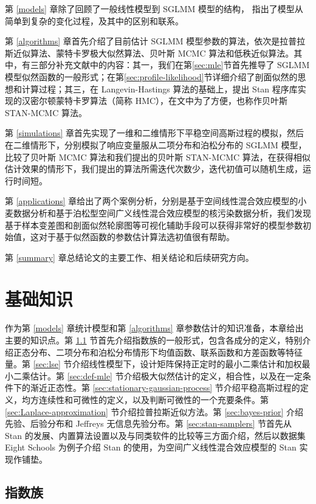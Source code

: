 \documentclass[12pt,a4paper,UTF8,twoside]{book}
\theoremstyle{definition}
\theoremstyle{definition}
\theoremstyle{definition}
\theoremstyle{remark}
\begin{document}
第 \ref{models} 章除了回顾了一般线性模型到 SGLMM 模型的结构，
指出了模型从简单到复杂的变化过程，及其中的区别和联系。

第 \ref{algorithms} 章首先介绍了目前估计 SGLMM
模型参数的算法，依次是拉普拉斯近似算法、蒙特卡罗极大似然算法、贝叶斯
MCMC
算法和低秩近似算法。其中，有三部分补充文献中的内容：其一，我们在第\ref{sec:mle}节首先推导了
SGLMM
模型似然函数的一般形式；在第\ref{sec:profile-likelihood}节详细介绍了剖面似然的思想和计算过程；其三，在
Langevin-Hastings 算法的基础上，提出 Stan
程序库实现的汉密尔顿蒙特卡罗算法（简称
HMC），在文中为了方便，也称作贝叶斯 STAN-MCMC 算法。

第 \ref{simulations}
章首先实现了一维和二维情形下平稳空间高斯过程的模拟，然后在二维情形下，分别模拟了响应变量服从二项分布和泊松分布的
SGLMM 模型，比较了贝叶斯 MCMC 算法和我们提出的贝叶斯 STAN-MCMC
算法，在获得相似估计效果的情形下，我们提出的算法所需迭代次数少，迭代初值可以随机生成，运行时间短。

第 \ref{applications}
章给出了两个案例分析，分别是基于空间线性混合效应模型的小麦数据分析和基于泊松型空间广义线性混合效应模型的核污染数据分析，我们发现基于样本变差图和剖面似然轮廓图等可视化辅助手段可以获得非常好的模型参数初始值，这对于基于似然函数的参数估计算法选初值很有帮助。

第 \ref{summary} 章总结论文的主要工作、相关结论和后续研究方向。

\hypertarget{prepare}{%
\chapter{基础知识}\label{prepare}}

作为第 \ref{models} 章统计模型和第 \ref{algorithms}
章参数估计的知识准备，本章给出主要的知识点。第 \ref{sec:exp}
节首先介绍指数族的一般形式，包含各成分的定义，特别介绍正态分布、二项分布和泊松分布情形下均值函数、联系函数和方差函数等特征量。第
\ref{sec:lse}
节介绍线性模型下，设计矩阵保持正定时的最小二乘估计和加权最小二乘估计。第
\ref{sec:def-mle}
节介绍极大似然估计的定义，相合性，以及在一定条件下的渐近正态性。第
\ref{sec:stationary-gaussian-process}
节介绍平稳高斯过程的定义，均方连续性和可微性的定义，以及判断可微性的一个充要条件。第
\ref{sec:Laplace-approximation} 节介绍拉普拉斯近似方法。第
\ref{sec:bayes-prior} 介绍先验、后验分布和 Jeffreys 无信息先验分布。第
\ref{sec:stan-samplers} 节首先从 Stan
的发展、内置算法设置以及与同类软件的比较等三方面介绍，然后以数据集 Eight
Schools 为例子介绍 Stan 的使用，为空间广义线性混合效应模型的 Stan
实现作铺垫。

\hypertarget{sec:exp}{%
\section{指数族}\label{sec:exp}}
\end{document}
